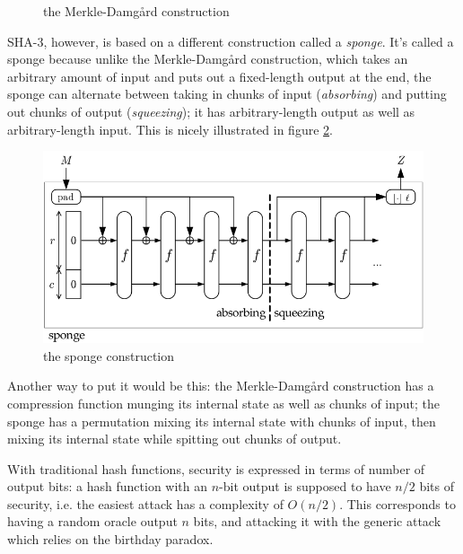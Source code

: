 \documentclass[times, utf8, diplomski]{fer}
\begin{document}
\begin{figure}[htb]\label{fig:merkle-damgard}
    \centering
    \caption{the Merkle-Damgård construction}
\end{figure}


SHA-3, however, is based on a different construction called a \emph{sponge}.
It's called a sponge because unlike the Merkle-Damgård construction, which takes
an arbitrary amount of input and puts out a fixed-length output at the end, the
sponge can alternate between taking in chunks of input (\emph{absorbing}) and
putting out chunks of output (\emph{squeezing}); it has arbitrary-length output
as well as arbitrary-length input.
This is nicely illustrated in figure \ref{fig:sponge}.


\begin{figure}[htb]
    \centering
    \includegraphics{images/sponge.png}
    \caption{the sponge construction}
    \label{fig:sponge}
\end{figure}

Another way to put it would be this: the Merkle-Damgård construction has a
compression function munging its internal state as well as chunks of input;
the sponge has a permutation mixing its internal state with chunks of input,
then mixing its internal state while spitting out chunks of output.

With traditional hash functions, security is expressed in terms of number of
output bits: a hash function with an $n$-bit output is supposed to have $n/2$
bits of security, i.e. the easiest attack has a complexity of $O(n/2)$.
This corresponds to having a random oracle output $n$ bits, and attacking it
with the generic attack which relies on the birthday paradox.
\end{document}
